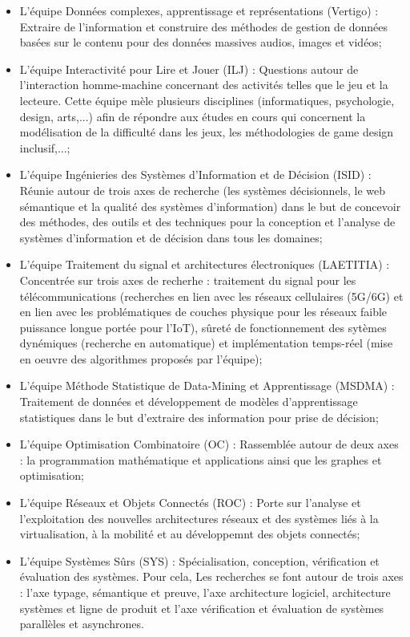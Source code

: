 \documentclass{article}
\begin{document}
		\begin{itemize}
			\item L'équipe Données complexes, apprentissage et représentations (Vertigo) : Extraire de l'information et construire des méthodes de gestion de données basées sur le contenu pour des données massives audios, images et vidéos;
			\item L'équipe Interactivité pour Lire et Jouer (ILJ) : Questions autour de l'interaction homme-machine concernant des activités telles que le jeu et la lecteure. Cette équipe mèle plusieurs disciplines (informatiques, psychologie, design, arts,...) afin de répondre aux études en cours qui concernent la modélisation de la difficulté dans les jeux, les méthodologies de game design inclusif,...;
			\item L'équipe Ingénieries des Systèmes d'Information et de Décision (ISID) : Réunie autour de trois axes de recherche (les systèmes décisionnels, le web sémantique et la qualité des systèmes d'information) dans le but de concevoir des méthodes, des outils et des techniques	pour la conception et l'analyse de systèmes d'information et de décision dans tous les domaines;
			\item L'équipe Traitement du signal et architectures électroniques (LAETITIA) : Concentrée sur trois axes de recherhe : traitement du signal pour les télécommunications (recherches en lien avec les réseaux cellulaires (5G/6G) et en lien avec les problématiques de couches physique pour les réseaux faible puissance longue portée pour l'IoT), sûreté de fonctionnement des sytèmes dynémiques (recherche en automatique) et implémentation temps-réel (mise en oeuvre des algorithmes proposés par l'équipe);
			\item L'équipe Méthode Statistique de Data-Mining et Apprentissage (MSDMA) : Traitement de données et développement de modèles d'apprentissage statistiques dans le but d'extraire des information pour prise de décision;
			\item L'équipe Optimisation Combinatoire (OC) : Rassemblée autour de deux axes : la programmation mathématique et applications ainsi que les graphes et optimisation;
			\item L'équipe Réseaux et Objets Connectés (ROC) : Porte sur l'analyse et l'exploitation des nouvelles architectures réseaux et des systèmes liés à la virtualisation, à la mobilité et au développemnt des objets connectés;
			\item L'équipe Systèmes Sûrs (SYS) : Spécialisation, conception, vérification et évaluation des systèmes. Pour cela, Les recherches se font autour de trois axes : l'axe typage, sémantique et preuve, l'axe architecture logiciel, architecture systèmes et ligne de produit et l'axe vérification  et évaluation de systèmes parallèles et asynchrones.
		\end{itemize}
\end{document}
